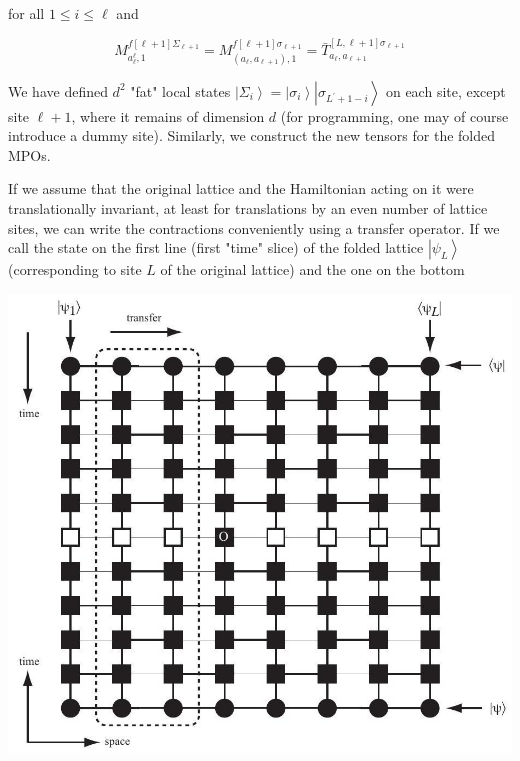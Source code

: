 \documentclass[12pt]{article}
\begin{document}
for all $1 \leq i \leq \ell$ and


\begin{equation*}
M_{a_{\ell}^{\ell}, 1}^{f[\ell+1] \Sigma_{\ell+1}}=M_{\left(a_{\ell}, a_{\ell+1}\right), 1}^{f[\ell+1] \sigma_{\ell+1}}=\bar{T}_{a_{\ell}, a_{\ell+1}}^{[L, \ell+1] \sigma_{\ell+1}} \tag{286}
\end{equation*}


We have defined $d^{2}$ "fat" local states $\left|\Sigma_{i}\right\rangle=\left|\sigma_{i}\right\rangle\left|\sigma_{L^{\prime}+1-i}\right\rangle$ on each site, except site $\ell+1$, where it remains of dimension $d$ (for programming, one may of course introduce a dummy site). Similarly, we construct the new tensors for the folded MPOs.

If we assume that the original lattice and the Hamiltonian acting on it were translationally invariant, at least for translations by an even number of lattice sites, we can write the contractions conveniently using a transfer operator. If we call the state on the first line (first "time" slice) of the folded lattice $\left|\psi_{L}\right\rangle$ (corresponding to site $L$ of the original lattice) and the one on the bottom

\begin{center}
\includegraphics[max width=\textwidth]{2024_05_04_afc4ad226da9ccfe0ac8g-093}
\end{center}
\end{document}
